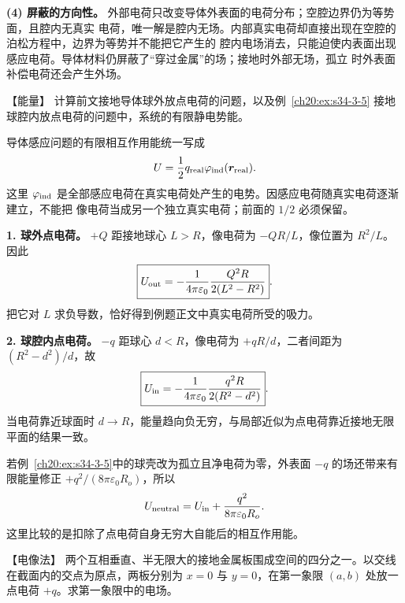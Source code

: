{\begin{xesolution}
\textbf{(4) 屏蔽的方向性。} 外部电荷只改变导体外表面的电荷分布；空腔边界仍为等势面，且腔内无真实
电荷，唯一解是腔内无场。内部真实电荷却直接出现在空腔的泊松方程中，边界为等势并不能把它产生的
腔内电场消去，只能迫使内表面出现感应电荷。导体材料仍屏蔽了“穿过金属”的场；接地时外部无场，孤立
时外表面补偿电荷还会产生外场。
\end{xesolution}



\begin{origexamplebox}{【能量】}\label{ch20:ex:s34-3-6}
计算前文接地导体球外放点电荷的问题，以及例~\ref{ch20:ex:s34-3-5} 接地球腔内放点电荷的问题中，系统的有限静电势能。

\ThQImageEnergy
\end{origexamplebox}\par\nopagebreak[4]

\begin{xesolution}
\ThAImageEnergy

导体感应问题的有限相互作用能统一写成
\[
  U=\frac12q_{\rm real}\varphi_{\rm ind}(\boldsymbol r_{\rm real}).
\]
这里 $\varphi_{\rm ind}$ 是全部感应电荷在真实电荷处产生的电势。因感应电荷随真实电荷逐渐建立，不能把
像电荷当成另一个独立真实电荷；前面的 $1/2$ 必须保留。

\textbf{1. 球外点电荷。} $+Q$ 距接地球心 $L>R$，像电荷为 $-QR/L$，像位置为 $R^2/L$。因此
\[
  \boxed{U_{\rm out}=-\frac1{4\pi\varepsilon_0}
  \frac{Q^2R}{2(L^2-R^2)}}.
\]
把它对 $L$ 求负导数，恰好得到例题正文中真实电荷所受的吸力。

\textbf{2. 球腔内点电荷。} $-q$ 距球心 $d<R$，像电荷为 $+qR/d$，二者间距为
$(R^2-d^2)/d$，故
\[
  \boxed{U_{\rm in}=-\frac1{4\pi\varepsilon_0}
  \frac{q^2R}{2(R^2-d^2)}}.
\]
当电荷靠近球面时 $d\to R$，能量趋向负无穷，与局部近似为点电荷靠近接地无限平面的结果一致。

若例~\ref{ch20:ex:s34-3-5}中的球壳改为孤立且净电荷为零，外表面 $-q$ 的场还带来有限能量修正
$+q^2/(8\pi\varepsilon_0R_o)$，所以
\[
  U_{\rm neutral}=U_{\rm in}+\frac{q^2}{8\pi\varepsilon_0R_o}.
\]
这里比较的是扣除了点电荷自身无穷大自能后的相互作用能。
\end{xesolution}



\begin{origexamplebox}{【电像法】}\label{ch20:ex:s34-3-7}
两个互相垂直、半无限大的接地金属板围成空间的四分之一。以交线在截面内的交点为原点，两板分别为
$x=0$ 与 $y=0$，在第一象限 $(a,b)$ 处放一点电荷 $+q$。求第一象限中的电场。
\par\noindent\begin{minipage}{\linewidth}
\emCornerQuestion
{}\label{ch20:fig:em-source-thirty-fourth-section-7}
\end{minipage}\par\medskip
\end{origexamplebox}\par\nopagebreak[4]

}
